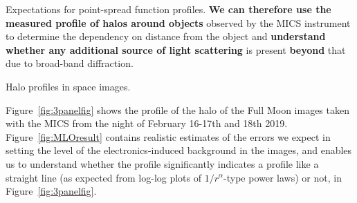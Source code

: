 \documentclass[final,hyperref={pdfpagelabels=false}]{beamer}
\begin{document}
\begin{frame}[t]
\begin{columns}[t]
\begin{column}{.23\textwidth}
\begin{block}{Expectations for point-spread function profiles.}
\textbf{We can therefore use the measured profile of halos around objects} observed by the MICS instrument to determine the dependency on distance from the object and \textbf{understand whether any additional source of light scattering} is present \textbf{beyond} that due to broad-band diffraction. 

\end{block}

\begin{block}{Halo profiles in space images.}

Figure~\ref{fig:3panelfig} shows the profile of the halo of the Full Moon images taken with the MICS from the night of February 16-17th and 18th 2019. Figure~\ref{fig:MLOresult} contains realistic estimates of the errors we expect in setting the level of the electronics-induced background in the images, and enables us to understand whether the profile significantly indicates a profile like a straight line (as expected from log-log plots of $1/r^{\alpha}$-type power laws) or not, in Figure~\ref{fig:3panelfig}.



\end{block}




\end{column}
\end{columns}
\end{frame}
\end{document}
